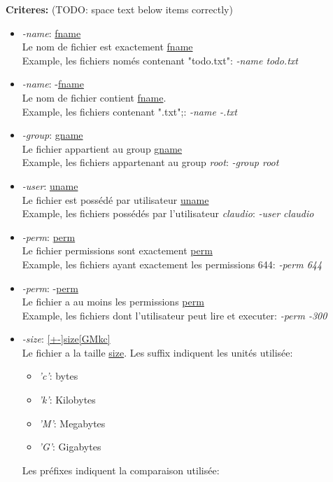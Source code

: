 \documentclass[11pt, a4paper]{article}
\begin{document}
\textbf{Criteres:} (TODO: space text below items correctly)
\begin{itemize}
	\renewcommand\labelitemii{}
    \item \textit{-name}: \underline{fname}\\
	   	Le nom de fichier est exactement \underline{fname}\\
	   	Example, les fichiers només contenant "todo.txt": \textit{-name todo.txt}
    \item \textit{-name}: -\underline{fname} \\
    Le nom de fichier contient \underline{fname}.\\
    Example, les fichiers contenant ".txt";:
    \textit{-name -.txt}
	\item \textit{-group}: \underline{gname}\\
	   	Le fichier appartient au group \underline{gname}\\
	   	Example, les fichiers appartenant au group \textit{root}: \textit{-group root}
	\item \textit{-user}: \underline{uname}\\
		Le fichier est possédé par utilisateur \underline{uname} \\
	   	Example, les fichiers possédés par l'utilisateur \textit{claudio}: \textit{-user claudio}
	\item \textit{-perm}: \underline{perm}\\
		Le fichier permissions sont exactement \underline{perm}\\
		Example, les fichiers ayant exactement les permissions 644: \textit{-perm 644}
	\item \textit{-perm}: -\underline{perm}\\
		Le fichier a au moins les permissions \underline{perm}\\
		Example, les fichiers dont l'utilisateur peut lire et executer: \textit{-perm -300}
	\item \textit{-size}: \underline{[+-]size[GMkc]}\\
		Le fichier a la taille \underline{size}.
		Les suffix indiquent les unités utilisée:
		\begin{itemize}
			\item \textit{'c'}: bytes
			\item \textit{'k'}: Kilobytes
			\item \textit{'M'}: Megabytes
			\item \textit{'G'}: Gigabytes
		\end{itemize}
		Les préfixes indiquent la comparaison utilisée:

\end{itemize}
\end{document}
